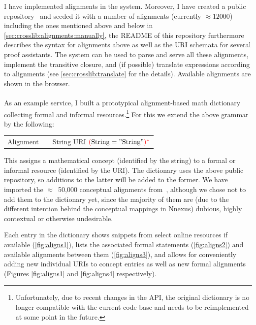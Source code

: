 I have implemented alignments in the \mmt system.  Moreover, I have
created a public repository~\cite{Alignments:on} and seeded it with a number of alignments
(currently $\approx12000$) including the ones mentioned above and below in \autoref{sec:crosslib:alignments:manually}, the README of this
repository furthermore describes the syntax for alignments above as well as the URI
schemata for several proof assistants.  The \mmt system can be used to parse and serve all
these alignments, implement the transitive closure, and (if possible) translate
expressions according to alignments (see \autoref{sec:crosslib:translate} for the details). Available alignments are shown in the \mmt browser.

\paragraph{} As an example service, I built a prototypical alignment-based math dictionary collecting formal and informal resources.\footnote{Unfortunately, due to recent changes in the \mmt API, the original dictionary is no longer compatible with the current code base and needs to be reimplemented at some point in the future.}
For this we extend the above grammar by the following:
\begin{center}
\begin{tabular}{l@{\tb}c@{\tb}l}
	Alignment & \bbc & String URI ${\color{red}(}\mathrm{String} = "\mathrm{String}"{\color{red})}^{{\color{red}\ast}}$
\end{tabular}
\end{center}
This assigns a mathematical concept (identified by the string) to a formal or informal resource (identified by the URI). The dictionary uses the above public re\-po\-si\-tory, so additions to the latter will be added to the former. We have imported the $\approx$~50,000 conceptual alignments from~\cite{GinCor:nnexus:14}, although we chose not to add them to the dictionary yet, since the majority of them are (due to the different intention behind the conceptual mappings in Nnexus) dubious, highly contextual or otherwise undesirable.

Each entry in the dictionary shows snippets from select online resources if available
(\autoref{fig:aligns1}), lists the associated formal statements (\autoref{fig:aligns2})
and available alignments between them (\autoref{fig:aligns3}), and allows for
conveniently adding new individual URIs to concept entries as well as new formal
alignments (Figures \ref{fig:aligns1} and \ref{fig:aligns4} respectively).

